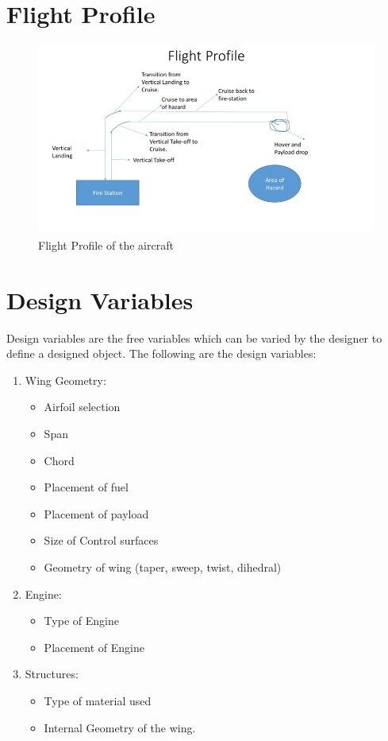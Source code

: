 \chapter{Flight Profile}
\begin{figure}[H]
\centering
\includegraphics[width = 1.25\textwidth]{fig4.png}
\caption{Flight Profile of the aircraft}
\label{Fig7.1}
\end{figure}

\chapter{Design Variables}
Design variables are the free variables which can be varied by the designer to define a
designed object. The following are the design variables:
\begin{enumerate}
\item Wing Geometry:
\begin{itemize}
\item Airfoil selection
\item Span
\item Chord
\item Placement of fuel
\item Placement of payload
\item Size of Control surfaces
\item Geometry of wing (taper, sweep, twist, dihedral)
\end{itemize}
\item Engine:
\begin{itemize}
\item Type of Engine
\item Placement of Engine
\end{itemize}
\item Structures:
\begin{itemize}
\item Type of material used
\item Internal Geometry of the wing.
\end{itemize}
\end{enumerate}
